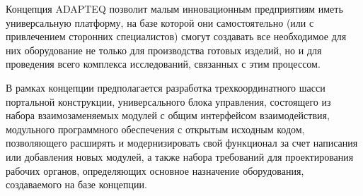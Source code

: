 Концепция \foreignlanguage{english}{ADAPTEQ} позволит малым инновационным предприятиям иметь универсальную платформу, на базе которой они самостоятельно (или с привлечением сторонних специалистов) смогут создавать все необходимое для них оборудование не только для производства готовых изделий, но и для проведения всего комплекса исследований, связанных с этим процессом.

В рамках концепции предполагается разработка трехкоординатного шасси портальной конструкции, универсального блока управления, состоящего из набора взаимозаменяемых модулей с общим интерфейсом взаимодействия, модульного программного обеспечения с открытым исходным кодом, позволяющего расширять и модернизировать свой функционал за счет написания или добавления новых модулей, а также набора требований для проектирования рабочих органов, определяющих основное назначение оборудования, создаваемого на базе концепции.

\FloatBarrier